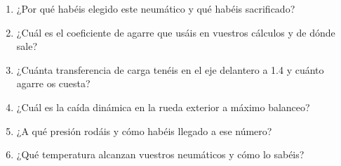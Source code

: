 \begin{juez}
\begin{enumerate}
  \item ¿Por qué habéis elegido este neumático y qué habéis sacrificado?
  \item ¿Cuál es el coeficiente de agarre que usáis en vuestros cálculos y de
        dónde sale?
  \item ¿Cuánta transferencia de carga tenéis en el eje delantero a
        \SI{1.4}{\gacc} y cuánto agarre os cuesta?
  \item ¿Cuál es la caída dinámica en la rueda exterior a máximo balanceo?
  \item ¿A qué presión rodáis y cómo habéis llegado a ese número?
  \item ¿Qué temperatura alcanzan vuestros neumáticos y cómo lo sabéis?
\end{enumerate}
\end{juez}

